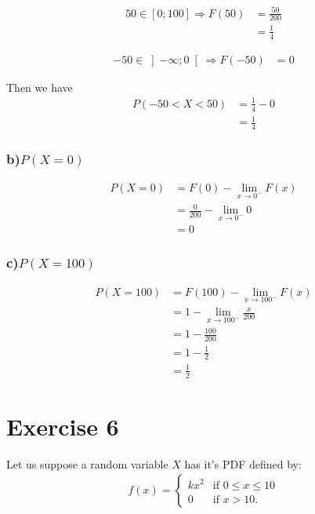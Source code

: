 \documentclass[11pt]{article}
\def\gt{>}
\def\lt{<}
\begin{document}
\begin{align*}
50\in  \left[0 ; 100\right] \Rightarrow F(50)&=\frac{50}{200}\\
 &=\frac{1}{4}
\end{align*}


\begin{align*}
-50\in  \left]-\infty ; 0\right[ \Rightarrow F(-50)&=0
\end{align*}

Then we have
\begin{align*}
P(-50\lt X \lt 50) &=\frac{1}{4}-0\\
				  &=\frac{1}{4}
\end{align*}

\subsubsection*{b)$P(X=0)$}

\begin{align*}
P(X=0) &=F(0)-\lim_{{x \to 0^-}} F(x)\\	
       &=\frac{0}{200}-\lim_{{x \to 0^-}} 0\\
       &=0
\end{align*}


\subsubsection*{c)$P(X=100)$}

\begin{align*}
P(X=100) &=F(100)-\lim_{{x \to 100^-}} F(x)\\	
       &=1-\lim_{{x \to 100^-}} \frac{x}{200}\\
       &=1-\frac{100}{200}\\
       &=1-\frac{1}{2}\\
       &=\frac{1}{2}
\end{align*}

\newpage 
    \section{Exercise 6}
    Let us suppose a random variable $X$ has it's PDF defined by:\\
    
\begin{align*}
f(x) = \begin{cases}
            kx^2 & \text{if } 0 \leq x \leq 10 \\
            0 & \text{if } x \gt 10.
        \end{cases}
\end{align*}
\end{document}
